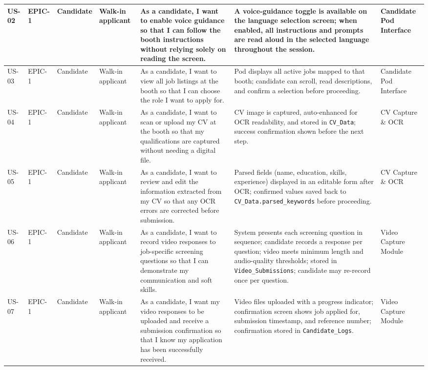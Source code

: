 \begin{longtable}{|p{0.8cm}|p{1.0cm}|p{1.2cm}|p{1.4cm}|p{4.2cm}|p{4.2cm}|p{1.8cm}|}
\rowcolor{nhRow1}
US-02 & EPIC-1 & Candidate & Walk-in applicant &
As a candidate, I want to enable voice guidance so that I can follow the booth instructions without relying solely on reading the screen. &
A voice-guidance toggle is available on the language selection screen; when enabled, all instructions and prompts are read aloud in the selected language throughout the session. & Candidate Pod Interface \\
\hline

\rowcolor{nhRow1}
US-03 & EPIC-1 & Candidate & Walk-in applicant &
As a candidate, I want to view all job listings at the booth so that I can choose the role I want to apply for. &
Pod displays all active jobs mapped to that booth; candidate can scroll, read descriptions, and confirm a selection before proceeding. & Candidate Pod Interface \\
\hline

\rowcolor{nhRow1}
US-04 & EPIC-1 & Candidate & Walk-in applicant &
As a candidate, I want to scan or upload my CV at the booth so that my qualifications are captured without needing a digital file. &
CV image is captured, auto-enhanced for OCR readability, and stored in \texttt{CV\_Data}; success confirmation shown before the next step. &
CV Capture \& OCR \\
\hline

\rowcolor{nhRow1}
US-05 & EPIC-1 & Candidate & Walk-in applicant &
As a candidate, I want to review and edit the information extracted from my CV so that any OCR errors are corrected before submission. &
Parsed fields (name, education, skills, experience) displayed in an editable form after OCR; confirmed values saved back to \texttt{CV\_Data.parsed\_keywords} before proceeding. &
CV Capture \& OCR \\
\hline

\rowcolor{nhRow1}
US-06 & EPIC-1 & Candidate & Walk-in applicant &
As a candidate, I want to record video responses to job-specific screening questions so that I can demonstrate my communication and soft skills. &
System presents each screening question in sequence; candidate records a response per question; video meets minimum length and audio-quality thresholds; stored in \texttt{Video\_Submissions}; candidate may re-record once per question. & Video Capture Module \\
\hline

\rowcolor{nhRow1}
US-07 & EPIC-1 & Candidate & Walk-in applicant &
As a candidate, I want my video responses to be uploaded and receive a submission confirmation so that I know my application has been successfully received. &
Video files uploaded with a progress indicator; confirmation screen shows job applied for, submission timestamp, and reference number; confirmation stored in \texttt{Candidate\_Logs}. & Video Capture Module \\
\hline


\end{longtable}
